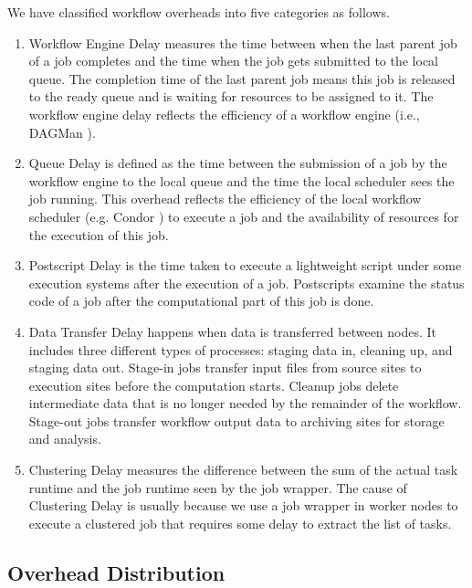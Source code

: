 We have classified workflow overheads into five categories as follows. 
\begin{enumerate}

\item{Workflow Engine Delay} measures the time between when the last parent job of a job completes and the time when the job gets submitted to the local queue. 
The completion time of the last parent job means this job is released to the ready queue and is waiting for resources to be assigned to it. The workflow engine delay reflects the efficiency of a workflow engine (i.e., DAGMan \cite{DAGMan}). 

\item{Queue Delay} is defined as the time between the submission of a job by the workflow engine to the local queue and the time the local scheduler sees the job running. This overhead reflects the efficiency of the local workflow scheduler (e.g. Condor \cite{Frey2002}) to execute a job and the availability of resources for the execution of this job. 

\item{Postscript Delay } is the time taken to execute a lightweight script under some execution systems after the execution of a job. Postscripts examine the status code of a job after the computational part of this job is done.

\item{Data Transfer Delay} happens when data is transferred between nodes. It includes three different types of processes: staging data in, cleaning up, and staging data out. Stage-in jobs transfer input files from source sites to execution sites before the computation starts. Cleanup jobs delete intermediate data that is no longer needed by the remainder of the workflow. Stage-out jobs transfer workflow output data to archiving sites for storage and analysis.

\item{Clustering Delay} measures the difference between the sum of the actual task runtime and the job runtime seen by the job wrapper. The cause of Clustering Delay is usually because we use a job wrapper in worker nodes to execute a clustered job that requires some delay to extract the list of tasks. 
\end{enumerate}

\subsection{Overhead Distribution}

